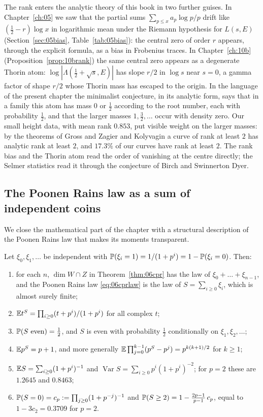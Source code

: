 The rank enters the analytic theory of this book in two further guises. In Chapter~\ref{ch:05} we saw that the partial sums $\sum_{p\le x}a_p\log p/p$ drift like $(\frac12-r)\log x$ in logarithmic mean under the Riemann hypothesis for $L(s,E)$ (Section~\ref{sec:05bias}, Table~\ref{tab:05bias}): the central zero of order $r$ appears, through the explicit formula, as a bias in Frobenius traces. In Chapter~\ref{ch:10b} (Proposition~\ref{prop:10brank}) the same central zero appears as a degenerate Thorin atom: $\log|\Lambda(\frac12+\sqrt s,E)|$ has slope $r/2$ in $\log s$ near $s = 0$, a gamma factor of shape $r/2$ whose Thorin mass has escaped to the origin. In the language of the present chapter the minimalist conjecture, in its analytic form, says that in a family this atom has mass $0$ or $\frac12$ according to the root number, each with probability $\frac12$, and that the larger masses $1,\frac32,\dots$ occur with density zero. Our small height data, with mean rank $0.853$, put visible weight on the larger masses: by the theorems of Gross and Zagier \cite{grosszagier1986} and Kolyvagin \cite{kolyvagin1988} a curve of rank at least $2$ has analytic rank at least $2$, and $17.3\%$ of our curves have rank at least $2$. The rank bias and the Thorin atom read the order of vanishing at the centre directly; the Selmer statistics read it through the conjecture of Birch and Swinnerton Dyer.

\subsection{The Poonen Rains law as a sum of independent coins}

We close the mathematical part of the chapter with a structural description of the Poonen Rains law that makes its moments transparent.

\begin{proposition}\label{prop:06cbernoulli}
Let $\xi_0,\xi_1,\dots$ be independent with $\mathbb{P}(\xi_i = 1) = 1/(1+p^i) = 1-\mathbb{P}(\xi_i = 0)$. Then:
\begin{enumerate}[label=(\alph*)]
\item for each $n$, $\dim W\cap Z$ in Theorem~\ref{thm:06cpr} has the law of $\xi_0+\dots+\xi_{n-1}$, and the Poonen Rains law \eqref{eq:06cprlaw} is the law of $S = \sum_{i\ge0}\xi_i$, which is almost surely finite;
\item $\mathbb{E} t^S = \prod_{i\ge0}(t+p^i)/(1+p^i)$ for all complex $t$;
\item $\mathbb{P}(S\text{ even}) = \frac12$, and $S$ is even with probability $\frac12$ conditionally on $\xi_1,\xi_2,\dots$;
\item $\mathbb{E} p^S = p+1$, and more generally $\mathbb{E}\prod_{j=0}^{k-1}(p^S-p^j) = p^{k(k+1)/2}$ for $k\ge1$;
\item $\mathbb{E} S = \sum_{i\ge0}(1+p^i)^{-1}$ and $\operatorname{Var}S = \sum_{i\ge0}p^i(1+p^i)^{-2}$; for $p = 2$ these are $1.2645$ and $0.8463$;
\item $\mathbb{P}(S = 0) = c_p := \prod_{j\ge0}(1+p^{-j})^{-1}$ and $\mathbb{P}(S\ge2) = 1-\frac{2p-1}{p-1}\,c_p$, equal to $1-3c_2 = 0.3709$ for $p = 2$.
\end{enumerate}
\end{proposition}


